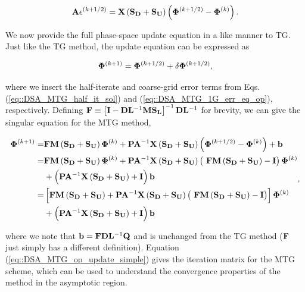 \begin{equation}
\label{eq::DSA_MTG_1G_err_eq_op}
{\bf A} \epsilon^{(k+1/2)}  =  {\bf X} \left( {\bf S_{D}} + {\bf S_{U}} \right) \left(  {\bf \Phi}^{(k+1/2)} - {\bf \Phi}^{(k)}  \right).
\end{equation}

We now provide the full phase-space update equation in a like manner to TG. Just like the TG method, the update equation can be expressed as 

\begin{equation}
\label{eq::DSA_MTG_update_op}
 {\bf \Phi}^{(k+1)} =  {\bf \Phi}^{(k+1/2)}  + \delta {\bf \Phi}^{(k+1/2)} ,
\end{equation}

\noindent where we insert the half-iterate and coarse-grid error terms from Eqs. (\ref{eq::DSA_MTG_half_it_sol}) and (\ref{eq::DSA_MTG_1G_err_eq_op}), respectively. Defining ${\bf F} \equiv \left[ {\bf I} - {\bf D}{\bf L}^{-1} {\bf M}{\bf S_L}\right]^{-1} {\bf D}{\bf L}^{-1} $ for brevity, we can give the singular equation for the MTG method,

\begin{equation}
\label{eq::DSA_MTG_op_update_simple}
\begin{aligned}
 {\bf \Phi}^{(k+1)} =  &{\bf F}  {\bf M} \left( {\bf S_{D}} + {\bf S_{U}} \right) {\bf \Phi}^{(k)} +  {\bf P} {\bf A}^{-1}  {\bf X} \left( {\bf S_{D}} + {\bf S_{U}} \right) \left(  {\bf \Phi}^{(k+1/2)} - {\bf \Phi}^{(k)}  \right) + {\bf b} \\
= &{\bf F}  {\bf M}\left( {\bf S_{D}} + {\bf S_{U}} \right) {\bf \Phi}^{(k)} +  {\bf P} {\bf A}^{-1}  {\bf X} \left( {\bf S_{D}} + {\bf S_{U}} \right) \left(  \ {\bf F}  {\bf M}\left( {\bf S_{D}} + {\bf S_{U}} \right)  -  {\bf I} \right){\bf \Phi}^{(k)} \\
&+ \left(  {\bf P} {\bf A}^{-1}  {\bf X} \left( {\bf S_{D}} + {\bf S_{U}} \right)  + {\bf I} \right) {\bf b} \\
= &\left[ {\bf F}  {\bf M} \left( {\bf S_{D}} + {\bf S_{U}} \right) +  {\bf P} {\bf A}^{-1}  {\bf X} \left( {\bf S_{D}} + {\bf S_{U}} \right) \left(  \ {\bf F}  {\bf M} \left( {\bf S_{D}} + {\bf S_{U}} \right)  -  {\bf I} \right) \right] {\bf \Phi}^{(k)} \\
&+ \left(  {\bf P} {\bf A}^{-1}  {\bf X} \left( {\bf S_{D}} + {\bf S_{U}} \right)  + {\bf I} \right) {\bf b}
\end{aligned} ,
\end{equation}

\noindent where we note that ${\bf b}={\bf F} {\bf D}{\bf L}^{-1}  {\bf Q}$ and is unchanged from the TG method (${\bf F}$ just simply has a different definition). Equation (\ref{eq::DSA_MTG_op_update_simple}) gives the iteration matrix for the MTG scheme, which can be used to understand the convergence properties of the method in the asymptotic region. 

